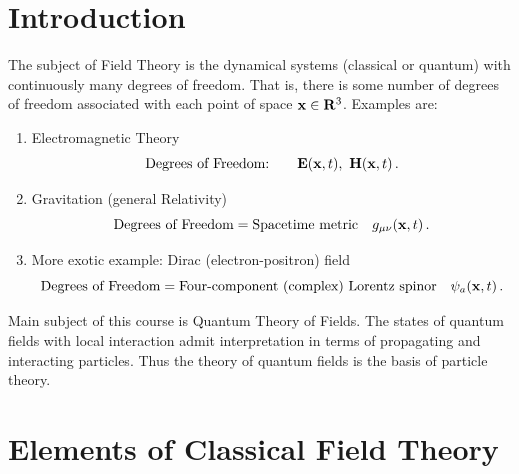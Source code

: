 \section*{Introduction}

The subject of Field Theory is the dynamical systems (classical or quantum)
with continuously many degrees of freedom. That is, there is some number of
degrees of freedom associated with each point of space $\mathbf{x}\in\mathbf{R}^3$. Examples
are:
\begin{enumerate}[label=(\roman*)]
\item Electromagnetic Theory
\[
\text{Degrees of Freedom:}\qquad \mathbf{E}(\xx,t),\ \mathbf{H}(\xx,t)\,.
\]
\item Gravitation (general Relativity)
\[
\text{Degrees of Freedom} = \text{Spacetime metric}\quad g_{\mu\nu}(\mathbf{x},t)\,.
\]
\item More exotic example: Dirac (electron-positron) field
\[
\text{Degrees of Freedom} = \text{Four-component (complex) Lorentz spinor}\quad \psi_a(\mathbf{x},t)\,.
\]
\end{enumerate}

Main subject of this course is Quantum Theory of Fields. The states of
quantum fields with local interaction admit interpretation in terms of
propagating and interacting particles. Thus the theory of quantum fields is
the basis of particle theory.

\section{Elements of Classical Field Theory}

